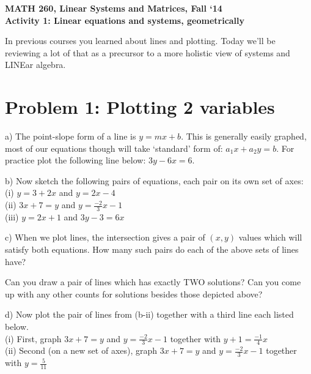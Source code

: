 \documentclass{article}
\begin{document}
\begin{flushleft}
	\bfseries{MATH 260, Linear Systems and Matrices, Fall `14}\\
	\bfseries{Activity 1:  Linear equations and systems, geometrically}\\
\end{flushleft}
\begin{flushleft}
\vspace{.25in}

In previous courses you learned about lines and plotting. Today we'll be reviewing a lot of that as a precursor to a more holistic view of systems and LINEar algebra.

\section*{Problem 1:  Plotting 2 variables}
\vspace{0.1in}

a) The point-slope form of a line is $y=mx+b$. This is generally easily graphed, most of our equations though will take `standard' form of: $a_1 x + a_2 y = b$. For practice plot the following line below: $3y-6x=6$.


\newpage

b) Now sketch the following pairs of equations, each pair on its own set of axes:\\
(i) $y=3+2x$ and $y=2x-4$\\
(ii) $3x+7=y$ and $y=\frac{-2}{3}x-1$\\
(iii) $y=2x+1$ and $3y-3=6x$

\vspace{4in}

c) When we plot lines, the intersection gives a pair of $(x,y)$ values which will satisfy both equations. How many such pairs do each of the above sets of lines have?\\

\vspace{1in}

Can you draw a pair of lines which has exactly TWO solutions? Can you come up with any other counts for solutions besides those depicted above?

\newpage
d) Now plot the pair of lines from (b-ii) together with a third line each listed below.\\
(i) First, graph $3x+7=y$ and $y=\frac{-2}{3}x-1$ together with $y+1=\frac{-1}{4}x$ \\
(ii) Second (on a new set of axes), graph $3x+7=y$ and $y=\frac{-2}{3}x-1$ together with $y=\frac{5}{11}$\\


\end{flushleft}
\end{document}
